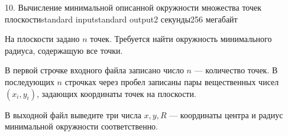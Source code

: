 \begin{problem}{10. Вычисление минимальной описанной окружности множества точек плоскости}{standard input}{standard output}{2 секунды}{256 мегабайт}

На плоскости задано $n$ точек. Требуется найти окружность минимального радиуса, содержащую все точки.

\InputFile

В первой строчке входного файла записано число $n$ --- количество точек. В последующих $n$ строчках через пробел записаны пары вещественных чисел $(x_i, y_i)$, задающих координаты точек на плоскости.

\OutputFile

В выходной файл выведите три числа $x, y, R$ --- координаты центра и радиус минимальной окружности соответственно.

\Examples

\begin{example}%
%
\end{example}

\end{problem}

